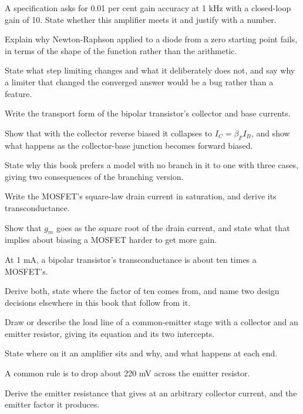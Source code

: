 A specification asks for 0.01 per cent gain accuracy at 1 kHz with a closed-loop gain of 10. State whether this amplifier meets it and justify with a number.

 Explain why Newton-Raphson applied to a diode from a zero starting point fails, in terms of the shape of the function rather than the arithmetic.

State what step limiting changes and what it deliberately does not, and say why a limiter that changed the converged answer would be a bug rather than a feature.

\label{exb:q:5}

 Write the transport form of the bipolar transistor's collector and base currents.

Show that with the collector reverse biased it collapses to $I_C = \beta_F I_B$, and show what happens as the collector-base junction becomes forward biased.

 State why this book prefers a model with no branch in it to one with three cases, giving two consequences of the branching version.

 Write the MOSFET's square-law drain current in saturation, and derive its transconductance.

Show that $g_m$ goes as the square root of the drain current, and state what that implies about biasing a MOSFET harder to get more gain.

 At 1 mA, a bipolar transistor's transconductance is about ten times a MOSFET's.

Derive both, state where the factor of ten comes from, and name two design decisions elsewhere in this book that follow from it.

\label{exb:q:6}

 Draw or describe the load line of a common-emitter stage with a collector and an emitter resistor, giving its equation and its two intercepts.

State where on it an amplifier sits and why, and what happens at each end.

 A common rule is to drop about 220 mV across the emitter resistor.

Derive the emitter resistance that gives at an arbitrary collector current, and the emitter factor it produces.

